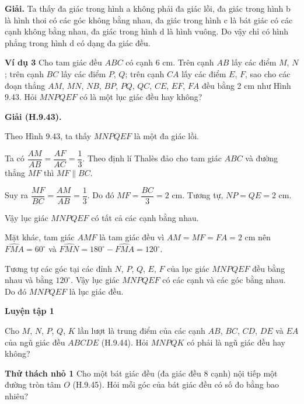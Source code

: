 \begin{lesson}
    \textbf{Giải.} Ta thấy đa giác trong hình a không phải đa giác lồi, đa giác trong hình b là hình thoi có các góc không bằng nhau, đa giác trong hình c là bát giác có các cạnh không bằng nhau, đa giác trong hình d là hình vuông. Do vậy chỉ có hình phẳng trong hình d có dạng đa giác đều.

    \textbf{Ví dụ 3} Cho tam giác đều $ABC$ có cạnh 6 cm. Trên cạnh $AB$ lấy các điểm $M$, $N$; trên cạnh $BC$ lấy các điểm $P$, $Q$; trên cạnh $CA$ lấy các điểm $E$, $F$, sao cho các đoạn thẳng $AM$, $MN$, $NB$, $BP$, $PQ$, $QC$, $CE$, $EF$, $FA$ đều bằng 2 cm như Hình 9.43. Hỏi $MNPQEF$ có là một lục giác đều hay không?


    \textbf{Giải (H.9.43).}

    Theo Hình 9.43, ta thấy $MNPQEF$ là một đa giác lồi.

    Ta có $\dfrac{AM}{AB}=\dfrac{AF}{AC}=\dfrac{1}{3}$. Theo định lí Thalès đảo cho tam giác $ABC$ và đường thẳng $MF$ thì $MF\parallel BC$.

    Suy ra $\dfrac{MF}{BC}=\dfrac{AM}{AB}=\dfrac{1}{3}$. Do đó $MF=\dfrac{BC}{3}=2$ cm. Tương tự, $NP=QE=2$ cm.

    Vậy lục giác $MNPQEF$ có tất cả các cạnh bằng nhau.

    Mặt khác, tam giác $AMF$ là tam giác đều vì $AM=MF=FA=2$ cm nên $\widehat{FMA}=60^\circ$ và $\widehat{FMN}=180^\circ-\widehat{FMA}=120^\circ$.

    Tương tự các góc tại các đỉnh $N$, $P$, $Q$, $E$, $F$ của lục giác $MNPQEF$ đều bằng nhau và bằng $120^\circ$. Vậy lục giác $MNPQEF$ có các cạnh và các góc bằng nhau. Do đó $MNPQEF$ là lục giác đều.

    \textbf{Luyện tập 1}

    Cho $M$, $N$, $P$, $Q$, $K$ lần lượt là trung điểm của các cạnh $AB$, $BC$, $CD$, $DE$ và $EA$ của ngũ giác đều $ABCDE$ (H.9.44). Hỏi $MNPQK$ có phải là ngũ giác đều hay không?


    \answerline
    \answerline

    \textbf{Thử thách nhỏ 1} Cho một bát giác đều (đa giác đều 8 cạnh) nội tiếp một đường tròn tâm $O$ (H.9.45). Hỏi mỗi góc của bát giác đều có số đo bằng bao nhiêu?



\end{lesson}
